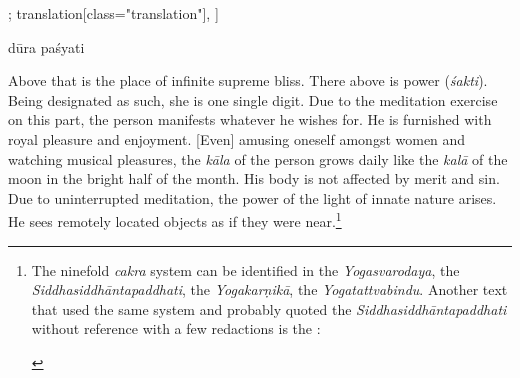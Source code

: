 \begin{alignment}[
  texts=edition[class="edition"];
  translation[class="translation"],
  ]
\begin{edition}
\begin{prose}
dūra
paśyati\dd{}
    \end{prose}
  \end{edition}
  \begin{translation}
    \begin{tlate}
      \noindent
      Above that is the place of infinite supreme bliss. There above is power (\textit{śakti}).\textsuperscript{\coro{[\lowroman{15}]}} Being designated as such, she is one single digit. Due to the meditation exercise on this part, the person manifests whatever he wishes for. He is furnished with royal pleasure and enjoyment. [Even] amusing oneself amongst women and watching musical pleasures, the \textit{kāla} of the person grows daily like the \textit{kalā} of the moon in the bright half of the month. His body is not affected by merit and sin.\textsuperscript{\coro{[\lowroman{20}]}} Due to uninterrupted meditation, the power of the light of innate nature arises. He sees remotely located objects as if they were near.\footnote{The ninefold \textit{cakra} system can be identified in the \textit{Yogasvarodaya}, the \textit{Siddhasiddhāntapaddhati}, the \textit{Yogakarṇikā}, the \textit{Yogatattvabindu}. Another text that used the same system and probably quoted the \textit{Siddhasiddhāntapaddhati} without reference with a few redactions is the :
        \begin{quote}

\end{quote}}
\end{tlate}
\end{translation}
\end{alignment}
